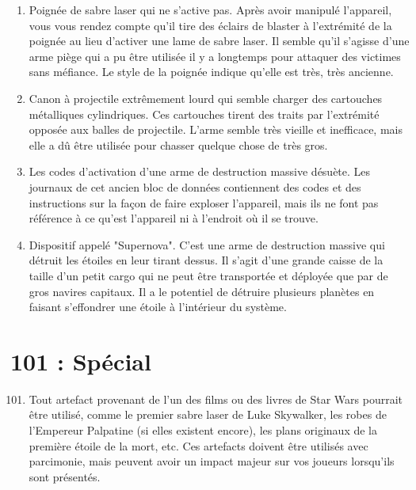 \documentclass{article}
\begin{document}
\begin{enumerate}
	\item Poignée de sabre laser qui ne s'active pas. Après avoir manipulé l'appareil, vous vous rendez compte qu'il tire des éclairs de blaster à l'extrémité de la poignée au lieu d'activer une lame de sabre laser. Il semble qu'il s'agisse d'une arme piège qui a pu être utilisée il y a longtemps pour attaquer des victimes sans méfiance. Le style de la poignée indique qu'elle est très, très ancienne.
	\item Canon à projectile extrêmement lourd qui semble charger des cartouches métalliques cylindriques. Ces cartouches tirent des traits par l'extrémité opposée aux balles de projectile. L'arme semble très vieille et inefficace, mais elle a dû être utilisée pour chasser quelque chose de très gros.
	\item Les codes d'activation d'une arme de destruction massive désuète. Les journaux de cet ancien bloc de données contiennent des codes et des instructions sur la façon de faire exploser l'appareil, mais ils ne font pas référence à ce qu'est l'appareil ni à l'endroit où il se trouve.
	\item Dispositif appelé "Supernova". C'est une arme de destruction massive qui détruit les étoiles en leur tirant dessus. Il s'agit d'une grande caisse de la taille d'un petit cargo qui ne peut être transportée et déployée que par de gros navires capitaux. Il a le potentiel de détruire plusieurs planètes en faisant s'effondrer une étoile à l'intérieur du système.
\end{enumerate}

\section*{101 : Spécial}
\begin{enumerate}
	\setcounter{enumi}{100}
	\item Tout artefact provenant de l'un des films ou des livres de Star Wars pourrait être utilisé, comme le premier sabre laser de Luke Skywalker, les robes de l'Empereur Palpatine (si elles existent encore), les plans originaux de la première étoile de la mort, etc. Ces artefacts doivent être utilisés avec parcimonie, mais peuvent avoir un impact majeur sur vos joueurs lorsqu'ils sont présentés.
\end{enumerate}
\end{document}
